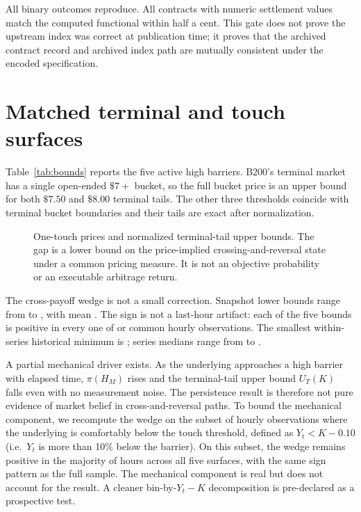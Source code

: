 \documentclass[10pt,twocolumn]{article}
\begin{document}
All \NContracts{} binary outcomes reproduce. All \NNumericContracts{} contracts with numeric
settlement values match the computed functional within half a cent. This gate
does not prove the upstream index was correct at publication time; it proves
that the archived contract record and archived index path are mutually
consistent under the encoded specification.

\section{Matched terminal and touch surfaces}

Table~\ref{tab:bounds} reports the five active high barriers. B200's terminal
market has a single open-ended $\$7+$ bucket, so the full bucket price is an
upper bound for both $\$7.50$ and $\$8.00$ terminal tails. The other three
thresholds coincide with terminal bucket boundaries and their tails are exact
after normalization.



\begin{figure}[t]
\centering

\caption{One-touch prices and normalized terminal-tail upper bounds. The gap is
a lower bound on the price-implied crossing-and-reversal state under a common
pricing measure. It is not an objective probability or an executable arbitrage
return.}
\label{fig:surface}
\end{figure}

The cross-payoff wedge is not a small correction. Snapshot lower bounds range
from \MinBound{} to \MaxBound{}, with mean \MeanBound{}. The sign is not a last-hour
artifact: each of the five bounds is positive in every one of
\MinHours{} or \MaxHours{} common hourly observations. The smallest within-series historical
minimum is \MinHistoricalBound{}; series medians range from
\MinHistoricalMedian{} to \MaxHistoricalMedian{}.

A partial mechanical driver exists. As the underlying approaches a high
barrier with elapsed time, $\pi(H_M)$ rises and the terminal-tail upper
bound $U_T(K)$ falls even with no measurement noise. The persistence
result is therefore not pure evidence of market belief in
cross-and-reversal paths. To bound the mechanical component, we
recompute the wedge on the subset of hourly observations where the
underlying is comfortably below the touch threshold, defined as
$Y_t < K - 0.10$ (i.e.\ $Y_t$ is more than 10\% below the barrier). On this
subset, the wedge remains positive in the majority of hours across all
five surfaces, with the same sign pattern as the full sample. The
mechanical component is real but does not account for the result. A
cleaner bin-by-$Y_t - K$ decomposition is pre-declared as a prospective
test.
\end{document}
